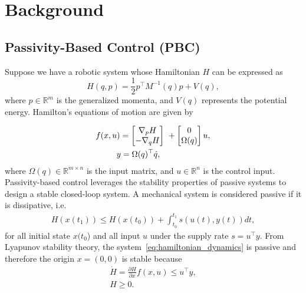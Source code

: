 
\section{Background}

\subsection{Passivity-Based Control (PBC)}
\label{ssec:pbc}

Suppose we have a robotic system whose Hamiltonian $H$ can be expressed as
%
\begin{equation}
    H(q,p) = \frac{1}{2} p^\top M^{-1}(q) p + V(q),
    \label{eq:system_hamiltonian}
\end{equation}
%
where $p \in \mathbb{R}^m$ is the generalized momenta, and $V(q)$ represents the
potential energy. Hamilton's equations of motion are given by

\begin{align}
    \begin{split}  
      f(x, u) &= \bmat{\nabla_pH \\ -\nabla_qH}\ + \bmat{0 \\ \Omega(q)}u, \\
      &\hspace{-0.15cm} y = \Omega(q)^\top \dot{q},
    \end{split}
    \label{eq:hamiltonian_dynamics}
\end{align}
\noindent where $\Omega(q) \in \mathbb{R}^{m \times n}$ is the input matrix, and $u
\in \mathbb{R}^{n}$ is the control input.
%
%
Passivity-based control leverages the stability properties of passive systems to
design a stable closed-loop system.
%
A mechanical system is considered passive if it is dissipative, i.e.
\begin{align}
  H(x(t_1)) \leq H(x(t_0)) + \int_{t_0}^{t_1} s(u(t), y(t)) dt,
\end{align}
\noindent for all initial state $x(t_0$) and all input $u$ under the supply rate
$s = u^\top y$.
%
From Lyapunov stability theory, the system~\eqref{eq:hamiltonian_dynamics} is
passive and therefore the origin $x = (0, 0)$ is stable because 
\begin{equation*}
  \begin{gathered}
    \dot{H} = \frac{\partial H}{\partial x} f(x, u) \leq u^\top y, \\
    H \geq 0.
  \end{gathered}
\end{equation*}

